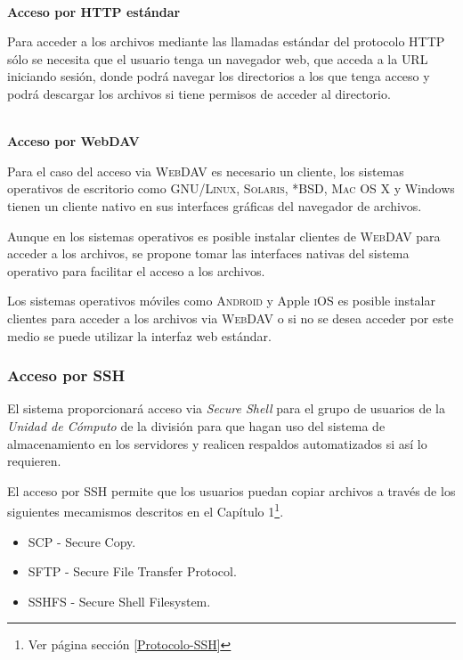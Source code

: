          \textbf{\\ Acceso por HTTP est\'{a}ndar \\}

Para acceder a los archivos mediante las llamadas est\'{a}ndar del protocolo HTTP s\'{o}lo se necesita que el usuario tenga un navegador web, que acceda a la \textsc{URL} iniciando sesi\'{o}n, donde podr\'{a} navegar los directorios a los que tenga acceso y podr\'{a} descargar los archivos si tiene permisos de acceder al directorio.

          \textbf{\\ Acceso por WebDAV \\}

Para el caso del acceso via \textsc{WebDAV} es necesario un cliente, los sistemas operativos de escritorio como \textsc{GNU/Linux}, \textsc{Solaris}, \textsc{*BSD}, \textsc{Mac OS X} y Windows tienen un cliente nativo en sus interfaces gr\'{a}ficas del navegador de archivos.

Aunque en los sistemas operativos es posible instalar clientes de \textsc{WebDAV} para acceder a los archivos, se propone tomar las interfaces nativas del sistema operativo para facilitar el acceso a los archivos.

Los sistemas operativos m\'{o}viles como \textsc{Android} y Apple \textsc{iOS} es posible instalar clientes para acceder a los archivos via \textsc{WebDAV} o si no se desea acceder por este medio se puede utilizar la interfaz web est\'{a}ndar.

        \subsubsection {Acceso por SSH}

El sistema proporcionar\'{a} acceso via \textit{Secure Shell} para el grupo de usuarios de la \textit{Unidad de C\'{o}mputo} de la divisi\'{o}n para que hagan uso del sistema de almacenamiento en los servidores y realicen respaldos automatizados si as\'{i} lo requieren.

El acceso por \textsc{SSH} permite que los usuarios puedan copiar archivos a trav\'{e}s de los siguientes mecamismos descritos en el Cap\'{i}tulo 1\footnote{Ver p\'{a}gina \pageref{Protocolo-SSH} secci\'{o}n \ref{Protocolo-SSH}}.

\begin{itemize}
  \item{\textsc{SCP} - Secure Copy}.
  \item{\textsc{SFTP} - Secure File Transfer Protocol}.
  \item{\textsc{SSHFS} - Secure Shell Filesystem}.
\end{itemize}

